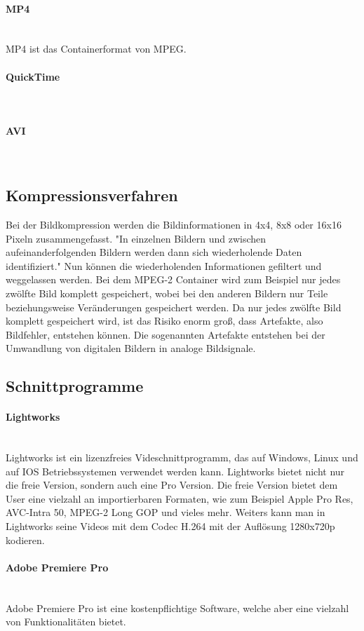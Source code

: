 \paragraph{MP4}
\leavevmode \\
MP4 ist das Containerformat von MPEG. 
\paragraph{QuickTime}
\leavevmode \\
\paragraph{AVI}
\leavevmode \\
\subsection{Kompressionsverfahren}
Bei der Bildkompression werden die Bildinformationen in 4x4, 8x8 oder 16x16 Pixeln zusammengefasst. "In einzelnen Bildern und zwischen aufeinanderfolgenden Bildern werden dann sich wiederholende Daten identifiziert." Nun können die wiederholenden Informationen gefiltert und weggelassen werden. Bei dem MPEG-2 Container wird zum Beispiel nur jedes zwölfte Bild komplett gespeichert, wobei bei den anderen Bildern nur Teile beziehungsweise Veränderungen gespeichert werden. Da nur jedes zwölfte Bild komplett gespeichert wird, ist das Risiko enorm groß, dass Artefakte, also Bildfehler, entstehen können. Die sogenannten Artefakte entstehen bei der Umwandlung von digitalen Bildern in analoge Bildsignale. 
\subsection{Schnittprogramme}
\paragraph{Lightworks}
\leavevmode \\
Lightworks ist ein lizenzfreies Videschnittprogramm, das auf Windows, Linux und auf IOS Betriebssystemen verwendet werden kann. Lightworks bietet nicht nur die freie Version, sondern auch eine Pro Version. Die freie Version bietet dem User eine vielzahl an importierbaren Formaten, wie zum Beispiel Apple Pro Res, AVC-Intra 50, MPEG-2 Long GOP und vieles mehr. Weiters kann man in Lightworks seine Videos mit dem Codec H.264 mit der Auflösung 1280x720p kodieren. 
\paragraph{Adobe Premiere Pro}
\leavevmode \\
Adobe Premiere Pro ist eine kostenpflichtige Software, welche aber eine vielzahl von Funktionalitäten bietet. 
